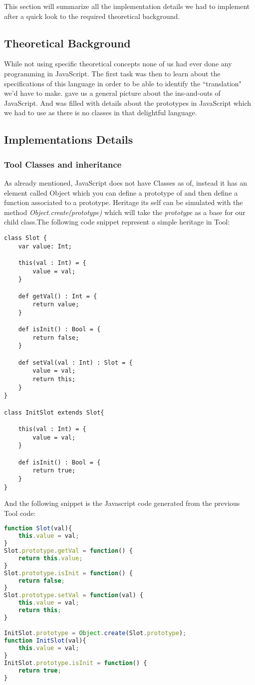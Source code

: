 This section will summarize all the implementation details we had to implement after a quick
look to the required theoretical background.

\subsection{Theoretical Background}
While not using specific theoretical concepts none of us had ever done any programming in JavaScript.
The first task was then to learn about the specifications of this language in order to be able to identify the ``translation" we'd have to make. \cite{JSGood} gave us a general picture about the ins-and-outs of JavaScript.
And \cite{JSProto} was filled with details about the prototypes in JavaScript which we had to use as there is no classes in that delightful language.

\subsection{Implementations Details}
\subsubsection{Tool Classes and inheritance}
As already mentioned, JavaScript does not have Classes as of, instead it has an element called Object which you can define a prototype of and then define a function associated to a prototype. Heritage its self can be simulated with the method \emph{Object.create(prototype)} which will take the \emph{prototype} as a base for our child class.The following code snippet represent a simple heritage in Tool:
\begin{lstlisting}
class Slot {
	var value: Int;

	this(val : Int) = {
		value = val;
	}

	def getVal() : Int = {
		return value;
	}

	def isInit() : Bool = {
		return false;
	}

	def setVal(val : Int) : Slot = {
		value = val;
		return this;
	}
}

class InitSlot extends Slot{

	this(val : Int) = {
		value = val;
	}

	def isInit() : Bool = {
		return true;
	}
}
\end{lstlisting}

And the following snippet is the Javascript code generated from the previous Tool code:
\begin{lstlisting}[language=javascript]
function Slot(val){
    this.value = val;
}
Slot.prototype.getVal = function() { 
    return this.value;
}
Slot.prototype.isInit = function() { 
    return false;
}
Slot.prototype.setVal = function(val) { 
    this.value = val;
    return this;
}

InitSlot.prototype = Object.create(Slot.prototype);
function InitSlot(val){
    this.value = val;
}
InitSlot.prototype.isInit = function() { 
    return true;
}

\end{lstlisting}

